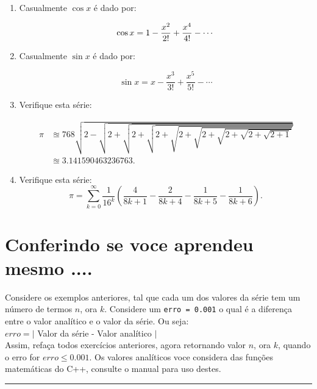 \documentclass[12pt,a4paper]{article}
\begin{document}
\begin{enumerate}
\begin{itemize}
      \end{itemize}


\item Casualmente $\cos x$ é dado por:

$$\cos x = 1 - {x^2 \over 2!} + {x^4 \over 4!} - \cdots$$

\item Casualmente $\sin x$ é dado por:

$$\sin x =  x - \frac{x^3}{3!} + \frac{x^5}{5!} - \cdots $$


\item Verifique esta série:

\begin{align}
\pi &\approxeq 768 \sqrt{2 - \sqrt{2 + \sqrt{2 + \sqrt{2 + \sqrt{2 + \sqrt{2 + \sqrt{2 + \sqrt{2 + \sqrt{2+1}}}}}}}}}\\
&\approxeq 3.141590463236763.
\end{align}


\item Verifique esta série:
$$\pi = \sum_{k = 0}^\infty \frac{1}{16^k}
\left( \frac{4}{8k + 1} - \frac{2}{8k + 4} - \frac{1}{8k + 5} - \frac{1}{8k + 6}\right).$$




\end{enumerate}

\section{Conferindo se voce aprendeu mesmo ....}

Considere os exemplos anteriores, tal que cada um dos valores da
série tem um número de termos $n$, ora $k$. Considere um \texttt{erro = 0.001}
o qual é a diferença entre o valor analítico e o valor da série.
Ou seja:\\


 $erro = \mid$ Valor da série - Valor analítico $\mid$\\


Assim, refaça todos exercícios anteriores, agora retornando valor $n$, ora $k$,
quando o erro for $erro \le 0.001$. Os valores analíticos voce considera
das funções matemáticas do C++, consulte o manual para uso destes.




\begin{center}
\rule{15cm}{0.1cm}
\end{center}
\end{document}
